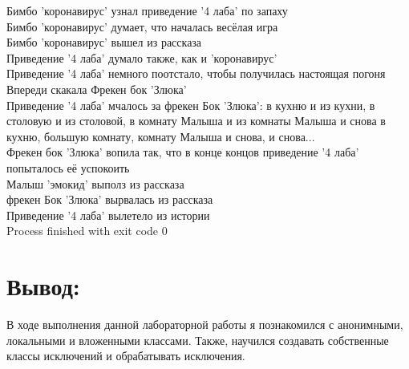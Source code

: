 \begin{center}
\begin{flushleft}
Бимбо 'коронавирус' узнал приведение '4 лаба' по запаху\\
Бимбо 'коронавирус' думает, что началась весёлая игра\\
Бимбо 'коронавирус' вышел из рассказа\\
Приведение '4 лаба' думало также, как и 'коронавирус'\\
Приведение '4 лаба' немного поотстало, чтобы получилась настоящая погоня\\
Впереди скакала Фрекен бок 'Злюка'\\
Приведение '4 лаба' мчалось за фрекен Бок 'Злюка': в кухню и из кухни, в столовую и из столовой, в комнату Малыша и из комнаты Малыша и снова в кухню, большую комнату, комнату Малыша и снова, и снова...\\
Фрекен бок 'Злюка' вопила так, что в конце концов приведение '4 лаба' попыталось её успокоить\\
Малыш 'эмокид' выполз из рассказа\\
фрекен Бок 'Злюка' вырвалась из рассказа\\
Приведение '4 лаба' вылетело из истории\\

Process finished with exit code 0
\end{flushleft}
\section{Вывод:}
\begin{flushleft}
\noindent В ходе выполнения данной лабораторной работы я познакомился с анонимными, локальными и вложенными классами. Также, научился создавать собственные классы исключений и обрабатывать исключения.
\end{flushleft}
\end{center}

